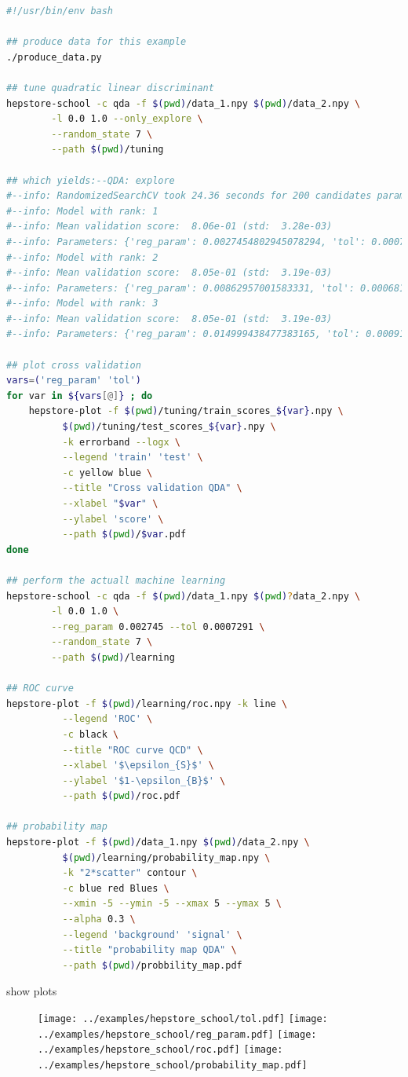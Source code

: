 \documentclass[aps,prd,11pt,tightenlines,superscriptaddress,nofootinbib,preprintnumbers,notitlepage]{revtex4-1}
\begin{document}
%
\begin{lstlisting}[language=Bash]
  #!/usr/bin/env bash

## produce data for this example
./produce_data.py

## tune quadratic linear discriminant
hepstore-school -c qda -f $(pwd)/data_1.npy $(pwd)/data_2.npy \
		-l 0.0 1.0 --only_explore \
		--random_state 7 \
		--path $(pwd)/tuning

## which yields:--QDA: explore
#--info: RandomizedSearchCV took 24.36 seconds for 200 candidates parameter settings.
#--info: Model with rank: 1
#--info: Mean validation score:  8.06e-01 (std:  3.28e-03)
#--info: Parameters: {'reg_param': 0.0027454802945078294, 'tol': 0.00072971227653656045}
#--info: Model with rank: 2
#--info: Mean validation score:  8.05e-01 (std:  3.19e-03)
#--info: Parameters: {'reg_param': 0.00862957001583331, 'tol': 0.00068120836729054681}
#--info: Model with rank: 3
#--info: Mean validation score:  8.05e-01 (std:  3.19e-03)
#--info: Parameters: {'reg_param': 0.014999438477383165, 'tol': 0.00091459513377715248}

## plot cross validation
vars=('reg_param' 'tol')
for var in ${vars[@]} ; do
    hepstore-plot -f $(pwd)/tuning/train_scores_${var}.npy \
		  $(pwd)/tuning/test_scores_${var}.npy \
		  -k errorband --logx \
		  --legend 'train' 'test' \
		  -c yellow blue \
		  --title "Cross validation QDA" \
		  --xlabel "$var" \
		  --ylabel 'score' \
		  --path $(pwd)/$var.pdf
done

## perform the actuall machine learning
hepstore-school -c qda -f $(pwd)/data_1.npy $(pwd)?data_2.npy \
		-l 0.0 1.0 \
		--reg_param 0.002745 --tol 0.0007291 \
		--random_state 7 \
		--path $(pwd)/learning

## ROC curve
hepstore-plot -f $(pwd)/learning/roc.npy -k line \
	      --legend 'ROC' \
	      -c black \
	      --title "ROC curve QCD" \
	      --xlabel '$\epsilon_{S}$' \
	      --ylabel '$1-\epsilon_{B}$' \
	      --path $(pwd)/roc.pdf

## probability map
hepstore-plot -f $(pwd)/data_1.npy $(pwd)/data_2.npy \
	      $(pwd)/learning/probability_map.npy \
	      -k "2*scatter" contour \
	      -c blue red Blues \
	      --xmin -5 --ymin -5 --xmax 5 --ymax 5 \
	      --alpha 0.3 \
	      --legend 'background' 'signal' \
	      --title "probability map QDA" \
	      --path $(pwd)/probbility_map.pdf
\end{lstlisting}
%
show plots
%
\begin{figure}
  \centering
  \texttt{[image: ../examples/hepstore\_school/tol.pdf]}
  \texttt{[image: ../examples/hepstore\_school/reg\_param.pdf]}
  \texttt{[image: ../examples/hepstore\_school/roc.pdf]}
  \texttt{[image: ../examples/hepstore\_school/probability\_map.pdf]}
  \caption{}
  \label{fig:example_plotting}
\end{figure}
%
\end{document}
